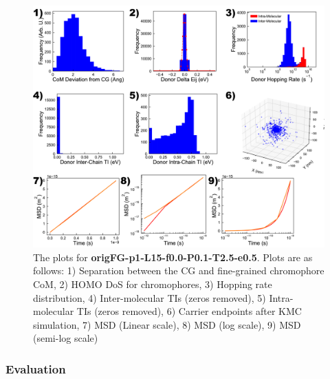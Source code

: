 \documentclass[12pt]{article}
\begin{document}
\begin{figure}[p]\centering
	\includegraphics[width=\textwidth]{Figures/T2_5.png}
    \caption{The plots for \textbf{origFG-p1-L15-f0.0-P0.1-T2.5-e0.5}. Plots are as follows: 1) Separation between the CG and fine-grained chromophore CoM, 2) HOMO DoS for chromophores, 3) Hopping rate distribution, 4) Inter-molecular TIs (zeros removed), 5) Intra-molecular TIs (zeros removed), 6) Carrier endpoints after KMC simulation, 7) MSD (Linear scale), 8) MSD (log scale), 9) MSD (semi-log scale)}
	\label{fig:T2.5}
\end{figure}


\clearpage

\subsubsection{Evaluation}
\end{document}
